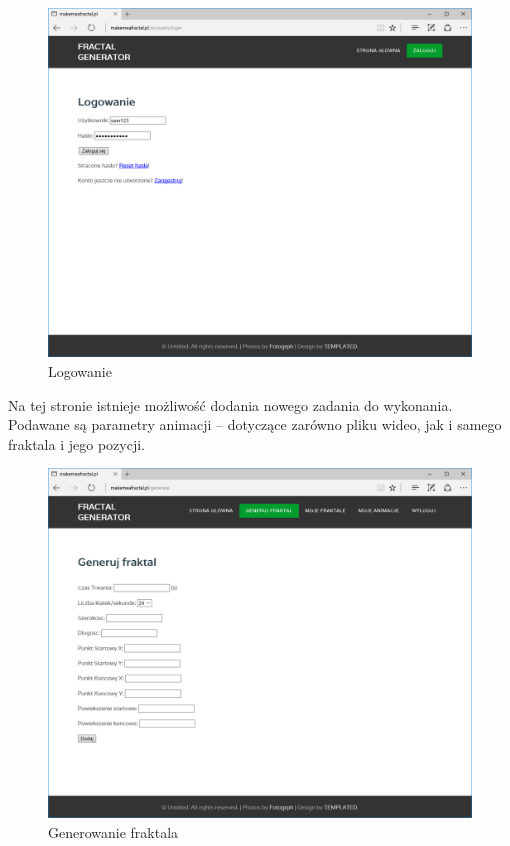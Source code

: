 \documentclass[a4paper]{article}
\begin{document}
\begin{figure}[H]
    \centering
    \includegraphics[width=\textwidth]{login_page.png}
    \caption{Logowanie}
    \label{fig:activ_page}
\end{figure}
\newpage
Na tej stronie istnieje możliwość dodania nowego zadania do wykonania. Podawane są parametry animacji -- dotyczące zarówno pliku wideo, jak i samego fraktala i jego pozycji.
\begin{figure}[H]
    \centering
    \includegraphics[width=\textwidth]{gen_page.png}
    \caption{Generowanie fraktala}
    \label{fig:gen_page}
\end{figure}
\end{document}
